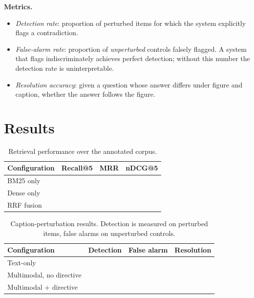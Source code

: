 \documentclass[conference]{IEEEtran}
\newif\ifdraftmode
\newcommand{\TODO}[1]{\ifdraftmode\textcolor{red}{\textbf{[TODO: #1]}}\fi}
\begin{document}
\textbf{Metrics.}
\begin{itemize}
  \item \emph{Detection rate}: proportion of perturbed items for which the
  system explicitly flags a contradiction.
  \item \emph{False-alarm rate}: proportion of \emph{unperturbed} controls
  falsely flagged. A system that flags indiscriminately achieves perfect
  detection; without this number the detection rate is uninterpretable.
  \item \emph{Resolution accuracy}: given a question whose answer differs
  under figure and caption, whether the answer follows the figure.
\end{itemize}
\TODO{Specify how flagging is adjudicated --- keyword match on the output is
too brittle to defend. Either define a rubric and have humans score a sample,
or use an LLM judge and report its agreement with human scores on that sample.
Do not report judge scores without that agreement number.}

\section{Results}
\label{sec:results}

\TODO{THIS SECTION IS EMPTY BY DESIGN. Populate only from executed runs.
Prerequisites, in order:
(1) content-derived chunk identifiers in the parser;
(2) ground-truth substitution removed from the evaluation harness;
(3) the annotated corpus built;
(4) the perturbation set constructed and human-verified;
(5) runs executed and logged.
Table skeletons below are placeholders --- they contain no data.}

\begin{table}[t]
\caption{Retrieval performance over the annotated corpus.}
\label{tab:retrieval}
\centering
\begin{tabular}{lccc}
\toprule
Configuration & Recall@5 & MRR & nDCG@5 \\
\midrule
BM25 only      & \TODO{} & \TODO{} & \TODO{} \\
Dense only     & \TODO{} & \TODO{} & \TODO{} \\
RRF fusion     & \TODO{} & \TODO{} & \TODO{} \\
\bottomrule
\end{tabular}
\end{table}

\begin{table}[t]
\caption{Caption-perturbation results. Detection is measured on perturbed
items, false alarms on unperturbed controls.}
\label{tab:perturbation}
\centering
\begin{tabular}{lccc}
\toprule
Configuration & Detection & False alarm & Resolution \\
\midrule
Text-only              & \TODO{} & \TODO{} & \TODO{} \\
Multimodal, no directive & \TODO{} & \TODO{} & \TODO{} \\
Multimodal + directive & \TODO{} & \TODO{} & \TODO{} \\
\bottomrule
\end{tabular}
\end{table}
\end{document}
